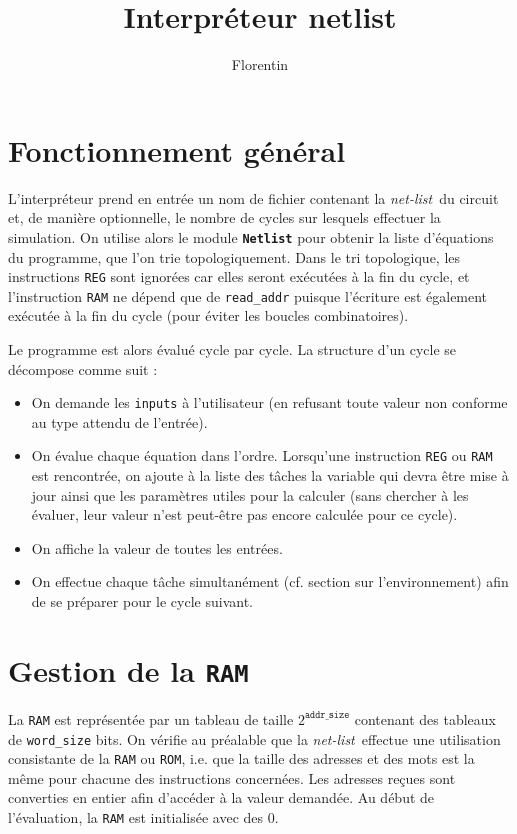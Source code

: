 \documentclass[a4paper, 10pt, french]{article}
\title{Interpréteur netlist}
\author{Florentin \bsc{Guth}}
\newcommand{\netlist}{\emph{net-list}}
\newcommand{\code}[1]{\texttt{#1}}
\begin{document}
\maketitle

\section{Fonctionnement général}

L'interpréteur prend en entrée un nom de fichier contenant la \netlist\ du circuit et, de manière optionnelle, le nombre de cycles sur lesquels effectuer la simulation. On utilise alors le module \code{\textbf{Netlist}} pour obtenir la liste d'équations du programme, que l'on trie topologiquement. Dans le tri topologique, les instructions \code{REG} sont ignorées car elles seront exécutées à la fin du cycle, et l'instruction \code{RAM} ne dépend que de \code{read\_addr} puisque l'écriture est également exécutée à la fin du cycle (pour éviter les boucles combinatoires).

Le programme est alors évalué cycle par cycle. La structure d'un cycle se décompose comme suit :
\begin{itemize}
 \item On demande les \code{inputs} à l'utilisateur (en refusant toute valeur non conforme au type attendu de l'entrée).
 \item On évalue chaque équation dans l'ordre. Lorsqu'une instruction \code{REG} ou \code{RAM} est rencontrée, on ajoute à la liste des tâches la variable qui devra être mise à jour ainsi que les paramètres utiles pour la calculer (sans chercher à les évaluer, leur valeur n'est peut-être pas encore calculée pour ce cycle).
 \item On affiche la valeur de toutes les entrées.
 \item On effectue chaque tâche \og simultanément \fg (cf. section sur l'environnement) afin de se préparer pour le cycle suivant.
\end{itemize}


\section{Gestion de la \code{RAM}}

La \code{RAM} est représentée par un tableau de taille $2^{\code{addr\_size}}$ contenant des tableaux de \code{word\_size} bits. On vérifie au préalable que la \netlist\ effectue une utilisation consistante de la \code{RAM} ou \code{ROM}, i.e. que la taille des adresses et des mots est la même pour chacune des instructions concernées. Les adresses reçues sont converties en entier afin d'accéder à la valeur demandée. Au début de l'évaluation, la \code{RAM} est initialisée avec des 0.
\end{document}
